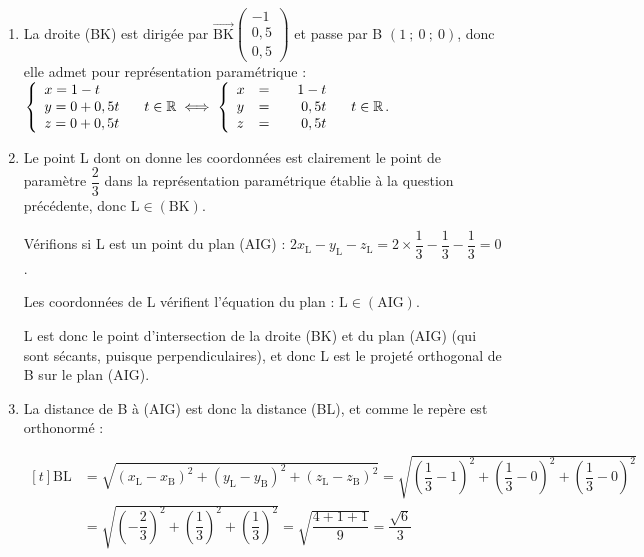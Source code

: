 \documentclass[10pt]{article}
\providecommand{\R}{\mathbb{R}}
\providecommand{\vect}[1]{\overrightarrow{#1}}
\begin{document}
\begin{enumerate}
$\begin{aligned}[t]  2x_\mathrm{A} - y_\mathrm{A} - z_\mathrm{A} + d=0 &\iff 2\times 0 - 0 - 0 + d = 0\\&\iff d =0\end{aligned}$

Finalement, une équation du plan (AIG) est donc bien $2x-y-z = 0$.

\item La droite (BK) est dirigée par $ \vect{\mathrm{BK}} \begin{pmatrix} -1\\0,5\\0,5 \end{pmatrix}$ et passe par B $ (1~;~0~;~0)$, donc elle admet pour représentation paramétrique :
\quad
$ \left\{\begin{array}{l} x = 1 - t\\y = 0 + 0,5t\\z = 0 + 0,5t  \end{array}\right. \quad t \in \R \iff \left\{\begin{array}{l c r} x &=& 1 - t\\y &=&\phantom{1 -}0,5t\\z &=&\phantom{1 -}0,5t \end{array}\right. \quad t \in \R$.

\item Le point L dont on donne les coordonnées est clairement le point de paramètre $ \dfrac{2}{3} $ dans la représentation paramétrique établie à la question précédente, donc $\mathrm{L} \in (\mathrm{BK})$.

Vérifions si L est un point du plan (AIG) : $2x_\mathrm{L} - y_\mathrm{L} -z_\mathrm{L} = 2\times \dfrac{1}{3} - \dfrac{1}{3} - \dfrac{1}{3} = 0$.

Les coordonnées de L vérifient l'équation du plan : $\mathrm{L} \in (\mathrm{AIG})$.

L est donc le point d'intersection de la droite (BK) et du plan (AIG) (qui sont sécants, puisque perpendiculaires), et donc L est le projeté orthogonal de B sur le plan (AIG).

\item La distance de B à (AIG) est donc la distance (BL), et comme le repère est orthonormé :

$\begin{aligned}[t] \mathrm{BL} &= \sqrt{\left(x_\mathrm{L} - x_\mathrm{B}\right)^2+\left(y_\mathrm{L} - y_\mathrm{B}\right)^2+\left(z_\mathrm{L} - z_\mathrm{B}\right)^2 }
			 = \sqrt{\left(\dfrac{1}{3}-1\right)^2+\left(\dfrac{1}{3}-0\right)^2+\left(\dfrac{1}{3}-0\right)^2 }\\
			 &=  \sqrt{\left(-\dfrac{2}{3}\right)^2+\left(\dfrac{1}{3}\right)^2+\left(\dfrac{1}{3}\right)^2 } = \sqrt{\dfrac{4 + 1 + 1}{9}} = \dfrac{\sqrt{6}}{3}\end{aligned}$
		\end{enumerate}
\end{document}
